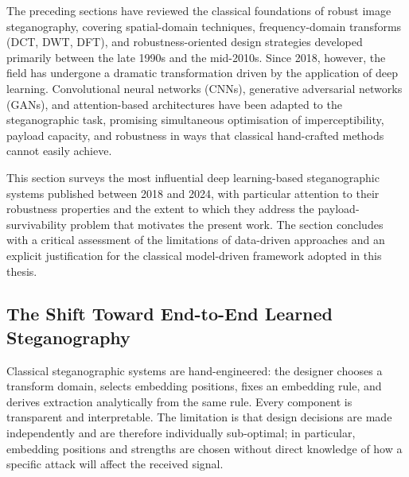 \documentclass[12pt,a4paper,oneside]{report}
\begin{document}
	The preceding sections have reviewed the classical foundations of robust image steganography,
	covering spatial-domain techniques, frequency-domain transforms (DCT, DWT, DFT), and
	robustness-oriented design strategies developed primarily between the late 1990s and the mid-2010s.
	Since 2018, however, the field has undergone a dramatic transformation driven by the application
	of deep learning. Convolutional neural networks (CNNs), generative adversarial networks (GANs),
	and attention-based architectures have been adapted to the steganographic task, promising
	simultaneous optimisation of imperceptibility, payload capacity, and robustness in ways that
	classical hand-crafted methods cannot easily achieve.
	
	This section surveys the most influential deep learning-based steganographic systems published
	between 2018 and 2024, with particular attention to their robustness properties and the extent to
	which they address the payload-survivability problem that motivates the present work. The section
	concludes with a critical assessment of the limitations of data-driven approaches and an explicit
	justification for the classical model-driven framework adopted in this thesis.
	
	\subsection{The Shift Toward End-to-End Learned Steganography}
	\label{subsec:dl_shift}
	
	Classical steganographic systems are hand-engineered: the designer chooses a transform domain,
	selects embedding positions, fixes an embedding rule, and derives extraction analytically from the
	same rule. Every component is transparent and interpretable. The limitation is that design
	decisions are made independently and are therefore individually sub-optimal; in particular,
	embedding positions and strengths are chosen without direct knowledge of how a specific attack
	will affect the received signal.
	
\end{document}
